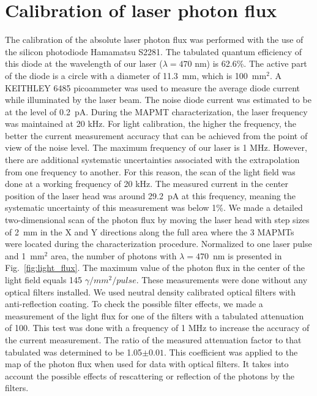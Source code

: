 \section{Calibration of laser photon flux}

The calibration of the absolute laser photon flux was performed with the use of the silicon photodiode Hamamatsu S2281.
The tabulated quantum efficiency of this diode at the wavelength of our laser ($\lambda=470$ nm) is 62.6\%. 
The active part of the diode is a circle with a diameter of 11.3~mm, which is 100~mm$^2$. 
A KEITHLEY 6485 picoammeter was used to measure the average diode current while illuminated by the laser beam.
The noise diode current was estimated to be at the level of 0.2~pA. 
During the MAPMT characterization, the laser frequency was maintained at 20 kHz. 
For light calibration, the higher the frequency, the better the current measurement accuracy that can be achieved from the point of view of the noise level. 
The maximum frequency of our laser is 1 MHz.
However, there are additional systematic uncertainties associated with the extrapolation from one frequency to another. 
For this reason, the scan of the light field was done at a working frequency of 20 kHz. 
The measured current in the center position of the laser head was around 29.2~pA at this frequency, meaning the systematic uncertainty
of this measurement was below 1\%.  We made a detailed two-dimensional scan of the photon flux by
moving the laser head with step sizes of 2~mm in the X and Y directions along the full area where the 3 MAPMTs were located during the characterization procedure.
Normalized to one laser pulse and 1~mm$^2$ area, the number of photons with $\lambda=470$~nm  is presented in Fig.~\ref{fig:light_flux}.
The maximum value of the photon flux in the center of the light field equals 145 $\gamma/mm^2/pulse$.
These measurements were done without  any optical filters installed. We used neutral density calibrated optical filters with anti-reflection coating.
To check the possible filter effects, we made a measurement of the light flux for one of the filters with a tabulated attenuation of 100. 
This test was done with a frequency of 1 MHz to increase the accuracy of the current measurement. 
The ratio of the measured attenuation factor to that tabulated was determined to be 1.05$\pm 0.01$. This coefficient was applied to the map of the photon flux when used for data with optical filters. It takes into account the possible effects of rescattering or reflection of the photons by the filters.
